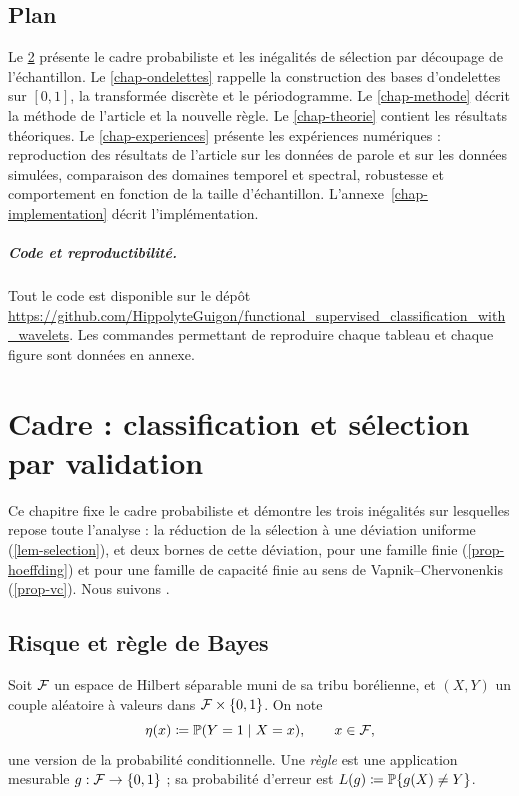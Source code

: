 \section{Plan}

Le \cref{chap-cadre} présente le cadre probabiliste et les inégalités de sélection par découpage de l'échantillon. Le \cref{chap-ondelettes} rappelle la construction des bases d'ondelettes sur $[0,1]$, la transformée discrète et le périodogramme. Le \cref{chap-methode} décrit la méthode de l'article et la nouvelle règle. Le \cref{chap-theorie} contient les résultats théoriques. Le \cref{chap-experiences} présente les expériences numériques : reproduction des résultats de l'article sur les données de parole et sur les données simulées, comparaison des domaines temporel et spectral, robustesse et comportement en fonction de la taille d'échantillon. L'annexe~\ref{chap-implementation} décrit l'implémentation.

\paragraph{Code et reproductibilité.} Tout le code est disponible sur le dépôt \url{https://github.com/HippolyteGuigon/functional_supervised_classification_with_wavelets}. Les commandes permettant de reproduire chaque tableau et chaque figure sont données en annexe.

\chapter{Cadre : classification et sélection par validation}\label{chap-cadre}

Ce chapitre fixe le cadre probabiliste et démontre les trois inégalités sur lesquelles repose toute l'analyse : la réduction de la sélection à une déviation uniforme (\cref{lem-selection}), et deux bornes de cette déviation, pour une famille finie (\cref{prop-hoeffding}) et pour une famille de capacité finie au sens de Vapnik--Chervonenkis (\cref{prop-vc}). Nous suivons \citet[chapitres 2, 8, 12 et 13]{devroye1996probabilistic}.

\section{Risque et règle de Bayes}

Soit $\mathcal{F}$ un espace de Hilbert séparable muni de sa tribu borélienne, et $(X,Y)$ un couple aléatoire à valeurs dans $\mathcal{F}\times\{0,1\}$. On note
\[
  \eta(x) \coloneqq \mathbb{P}(Y=1\mid X=x), \qquad x\in\mathcal{F},
\]
une version de la probabilité conditionnelle. Une \emph{règle} est une application mesurable $g:\mathcal{F}\to\{0,1\}$ ; sa probabilité d'erreur est $L(g)\coloneqq\mathbb{P}\{g(X)\neq Y\}$.

